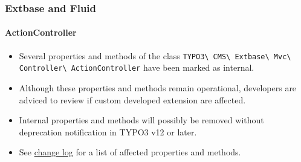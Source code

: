 %

\begin{frame}[fragile]
	\frametitle{Extbase and Fluid}
	\framesubtitle{ActionController}

	\begin{itemize}
		\item Several properties and methods of the class
			\small\texttt{TYPO3\textbackslash
				CMS\textbackslash
				Extbase\textbackslash
				Mvc\textbackslash
				Controller\textbackslash
				ActionController}\normalsize\newline
			have been marked as internal.
		\item Although these properties and methods remain operational,
			developers are adviced to review if custom developed extension are affected.
		\item Internal properties and methods will possibly be removed without deprecation
			notification in TYPO3 v12 or later.
		\item See \href{https://docs.typo3.org/c/typo3/cms-core/master/en-us/Changelog/11.0/Important-92996-PropertiesAndMethodsInActionControllerMarkedInternal.html}{change log}
			for a list of affected properties and methods.
	\end{itemize}

\end{frame}

